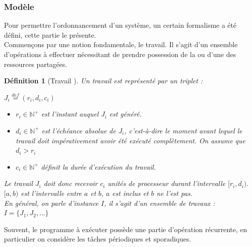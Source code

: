 \documentclass[12pt,a4paper,oneside]{book}
\theoremstyle{break}
\newtheorem{defin}{Définition}[chapter]
\theoremstyle{breakplain}
\begin{document}
\subsubsection{Modèle}
Pour permettre l'ordonnancement d'un système, un certain formalisme a été défini, cette partie le présente.\\

Commençons par une notion fondamentale, le travail. Il s'agit d'un ensemble d'opérations à effectuer nécessitant de prendre possession de la ou d'une des ressources partagées.\\

\begin{defin}[Travail \cite{goossens2014os}]
Un travail est représenté par un triplet : 
\begin{center}
$J_i \overset{def}{=} (r_i, d_i, c_i)$
\end{center}
\begin{itemize}
\item $r_i \in \mathbb{N}^{+}$ est l'instant auquel $J_i$ est généré.
\item $d_i \in \mathbb{N}^{+}$ est l'échéance absolue de $J_i$, c'est-à-dire le moment avant lequel le travail doit impérativement avoir été exécuté complètement. On assume que $d_i > r_i$
\item $c_i \in \mathbb{N}^{+}$ définit la durée d'exécution du travail.
\end{itemize}
Le travail $J_i$ doit donc recevoir $c_i$ unités de processeur durant l'intervalle $[r_i, d_i)$. $[a,b)$ est l'intervalle entre $a$ et $b$, $a$ est inclus et $b$ ne l'est pas. \\
En général, on parle d'instance $I$, il s'agit d'un ensemble de travaux : $ I = \{J_1, J_2, ...\} $
\end{defin}
Souvent, le programme à exécuter possède une partie d'opération récurrente, en particulier on considère les tâches périodiques et sporadiques.\\
\end{document}
